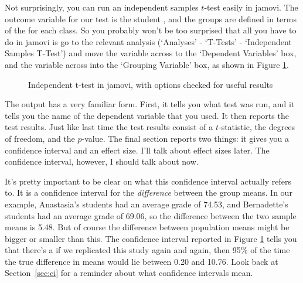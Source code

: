 
Not surprisingly, you can run an independent samples $t$-test easily in jamovi. The outcome variable for our test is the student , and the groups are defined in terms of the  for each class. So you probably won't be too surprised that all you have to do in jamovi is go to the relevant analysis (`Analyses' - `T-Tests' - `Independent Samples T-Test') and move the  variable across to the `Dependent Variables' box, and the  variable across into the `Grouping Variable' box, as shown in Figure \ref{fig:ttest_ind}.

\begin{figure}[htb]
\begin{center}
\caption{Independent t-test in jamovi, with options checked for useful results}
\HR
\label{fig:ttest_ind}
\end{center}
\end{figure}

The output has a very familiar form. First, it tells you what test was run, and it tells you the name of the dependent variable that you used. It then reports the test results. Just like last time the test results consist of a $t$-statistic, the degrees of freedom, and the $p$-value. The final section reports two things: it gives you a confidence interval and an effect size. I'll talk about effect sizes later. The confidence interval, however, I should talk about now. 

It's pretty important to be clear on what this confidence interval actually refers to. It is a confidence interval for the {\it difference} between the group means. In our example, Anastasia's students had an average grade of 74.53, and Bernadette's students had an average grade of 69.06, so the difference between the two sample means is 5.48. But of course the difference between population means might be bigger or smaller than this. The confidence interval reported in Figure \ref{fig:ttest_ind} tells you that there's a if we replicated this study again and again, then 95\% of the time the true difference in means would lie between 0.20 and 10.76. Look back at Section~\ref{sec:ci} for a reminder about what confidence intervals mean.  

